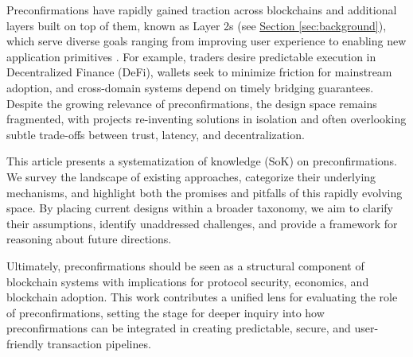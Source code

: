 \documentclass[a4paper]{article}
\theoremstyle{boldstyle}
\begin{document}
Preconfirmations have rapidly gained traction across blockchains and additional layers built on top of them, known as Layer 2s (see \hyperref[sec:background]{Section \ref{sec:background}}), which serve diverse goals ranging from improving user experience to enabling new application primitives \cite{Optimism,Arbitrum,ZKsync, W:TaikoPreconfDesign, W:JitoSolanaShreds}. For example, traders desire predictable execution in Decentralized Finance (DeFi), wallets seek to minimize friction for mainstream adoption, and cross-domain systems depend on timely bridging guarantees. Despite the growing relevance of preconfirmations, the design space remains fragmented, with projects re-inventing solutions in isolation and often overlooking subtle trade-offs between trust, latency, and decentralization. \par
This article presents a systematization of knowledge (SoK) on preconfirmations. We survey the landscape of existing approaches, categorize their underlying mechanisms, and highlight both the promises and pitfalls of this rapidly evolving space. By placing current designs within a broader taxonomy, we aim to clarify their assumptions, identify unaddressed challenges, and provide a framework for reasoning about future directions.

Ultimately, preconfirmations should be seen as a structural component of blockchain systems with implications for protocol security, economics, and blockchain adoption. This work contributes a unified lens for evaluating the role of preconfirmations, setting the stage for deeper inquiry into how preconfirmations can be integrated in creating predictable, secure, and user-friendly transaction pipelines.
\end{document}
